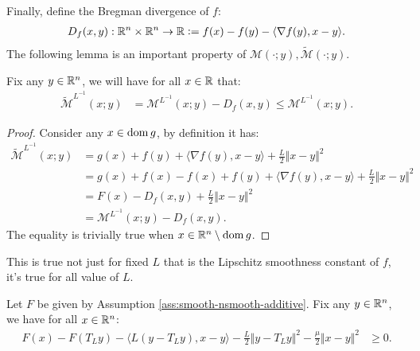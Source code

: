 \documentclass[12pt]{article}
\begin{document}
    Finally, define the Bregman divergence of $f$: 
    \begin{align*}
        D_f(x, y): \mathbb R^n \times \mathbb R^n \rightarrow \mathbb R 
        \vcentcolon= f(x) - f(y) - \langle \nabla f(y), x - y\rangle. 
    \end{align*}
    The following lemma is an important property of $\mathcal M(\cdot; y), \widetilde{\mathcal M}(\cdot; y)$. 
    \begin{lemma}\label{lemma:pg-envelope}
        Fix any $y \in \mathbb R^n$, we will have for all $x \in \mathbb R$ that: 
        \begin{align*}
            \widetilde{\mathcal M}^{L^{-1}}(x; y)
            &= 
            \mathcal M^{L^{-1}}(x; y)- D_f(x, y) \le \mathcal M^{L^{-1}}(x; y). 
        \end{align*}
    \end{lemma}
    \begin{proof}
        Consider any $x \in \operatorname{dom} g$, by definition it has: 
        \begin{align*}
            \widetilde{\mathcal M}^{L^{-1}}(x; y) 
            &= 
            g(x) + f(y) + \langle \nabla f(y), x - y\rangle + \frac{L}{2}\Vert x - y\Vert^2
            \\
            &= 
            g(x) + f(x) - f(x) + f(y) 
            + \langle \nabla f(y), x - y\rangle + \frac{L}{2}\Vert x - y\Vert^2
            \\
            &= 
            F(x) - D_f(x, y) + \frac{L}{2}\Vert x - y\Vert^2 
            \\
            &= \mathcal M^{L^{-1}}(x; y) - D_f(x, y). 
        \end{align*}
        The equality is trivially true when $x \in \mathbb R^n \setminus \operatorname{dom} g$. 
    \end{proof}
    \begin{remark}
        This is true not just for fixed $L$ that is the Lipschitz smoothness constant of $f$, it's true for all value of $L$. 
    \end{remark}
    \begin{theorem}\label{thm:prox-grad-ineq}
        Let $F$ be given by Assumption \ref{ass:smooth-nsmooth-additive}. 
        Fix any $y\in \mathbb R^n$, we have for all $x \in \mathbb R^n$: 
        \begin{align*}
            F(x) - F(T_Ly) - \langle L(y - T_Ly), x - y\rangle
            - \frac{L}{2}\Vert y - T_L y\Vert^2
            - \frac{\mu}{2}\Vert x - y\Vert^2
            &\ge  
            0.
        \end{align*}
    \end{theorem}
\end{document}
